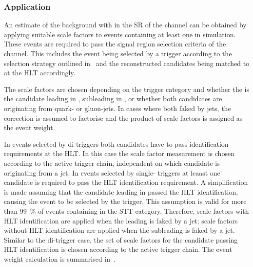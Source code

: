 \subsubsection{Application}

An estimate of the \ttbar background with \faketauhadvis in the SR of
the \hadhad channel can be obtained by applying suitable scale factors
to events containing at least one \faketauhadvis in \ttbar simulation.
These events are required to pass the signal region selection criteria
of the \hadhad channel. This includes the event being selected by a
trigger according to the selection strategy outlined
in~ and the reconstructed \tauhadvis candidates
being matched to \tauhadvis at the HLT accordingly.

The scale factors are chosen depending on the trigger category and
whether the \faketauhadvis is the \tauhadvis candidate leading in \pT,
subleading in \pT, or whether both candidates are originating from
quark- or gluon-jets. In cases where both \tauhadvis faked by jets,
the correction is assumed to factorise and the product of scale
factors is assigned as the event weight.

In events selected by di-\tauhadvis triggers both \tauhadvis
candidates have to pass identification requirements at the HLT. In
this case the scale factor measurement is chosen according to the
active trigger chain, independent on which \tauhadvis candidate is
originating from a jet. In events selected by single-\tauhadvis
triggers at leaast one \tauhadvis candidate is required to pass the
HLT \tauhadvis identification requirement. A simplification is made
assuming that the \tauhadvis candidate leading in \pT passed the HLT
\tauhadvis identification, causing the event to be selected by the
trigger. This assumption is valid for more than \SI{99}{\percent} of
\ttbar events containing \faketauhadvis in the STT
category. Therefore, scale factors with HLT identification are applied
when the leading \tauhadvis is faked by a jet; scale factors without
HLT identification are applied when the subleading \tauhadvis is faked
by a jet. Similar to the di-\tauhadvis trigger case, the set of scale
factors for the candidate passing HLT identification is chosen
according to the active trigger chain. The event weight calculation is
summarised in~.


